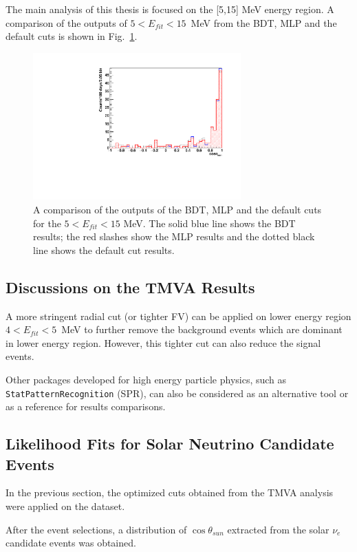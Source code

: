 The main analysis of this thesis is focused on the [5,15] MeV energy region. A comparison of the outputs of $5<E_{fit}<15$~MeV from the BDT, MLP and the default cuts is shown in Fig.~\ref{compare_cosThetaToSun_5to15}.
\begin{figure}[!htb]
	\centering
	\includegraphics[width=8cm]{Compare_cosThetaSun_5to15.pdf}
	\caption[A comparison of the outputs of the BDT, MLP and the default cuts for the $5<E_{fit}<15$ MeV.]{A comparison of the outputs of the BDT, MLP and the default cuts for the $5<E_{fit}<15$ MeV. The solid blue line shows the BDT results; the red slashes show the MLP results and the dotted black line shows the default cut results.}
	\label{compare_cosThetaToSun_5to15}
\end{figure}

\subsection{Discussions on the TMVA Results}
A more stringent radial cut (or tighter FV) can be applied on lower energy region $4<E_{fit}<5$~MeV to further remove the background events which are dominant in lower energy region. However, this tighter cut can also reduce the signal events.

Other packages developed for high energy particle physics, such as \texttt{StatPatternRecognition} (SPR)\cite{sprWebsite}, can also be considered as an alternative tool or as a reference for results comparisons. 

\subsection{Likelihood Fits for Solar Neutrino Candidate Events}
In the previous section, the optimized cuts obtained from the TMVA analysis were applied on the dataset. 

After the event selections, a distribution of $\cos\theta_{sun}$ extracted from the solar $\nu_e$ candidate events was obtained. 

